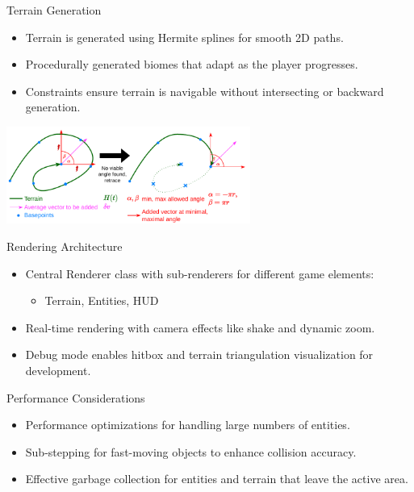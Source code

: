 \documentclass{beamer}
\begin{document}
\begin{frame}{Terrain Generation}
    \begin{itemize}
        \item Terrain is generated using Hermite splines for smooth 2D paths.
        \item Procedurally generated biomes that adapt as the player progresses.
        \item Constraints ensure terrain is navigable without intersecting or backward generation.
    \end{itemize}
    \centering
    \includegraphics[width=0.6\textwidth]{../figures/Retrace.pdf} %
\end{frame}

\begin{frame}{Rendering Architecture}
    \begin{itemize}
        \item Central Renderer class with sub-renderers for different game elements:
        \begin{itemize}
            \item Terrain, Entities, HUD
        \end{itemize}
        \item Real-time rendering with camera effects like shake and dynamic zoom.
        \item Debug mode enables hitbox and terrain triangulation visualization for development.
    \end{itemize}
\end{frame}

\begin{frame}{Performance Considerations}
    \begin{itemize}
        \item Performance optimizations for handling large numbers of entities.
        \item Sub-stepping for fast-moving objects to enhance collision accuracy.
        \item Effective garbage collection for entities and terrain that leave the active area.
    \end{itemize}
\end{frame}
\end{document}
